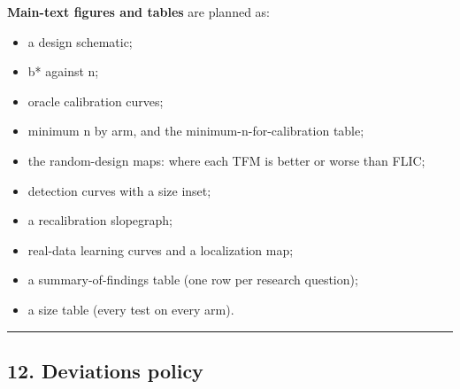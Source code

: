 \documentclass[
  10pt,
]{article}
\providecommand{\tightlist}{%
  \setlength{\itemsep}{0pt}\setlength{\parskip}{0pt}}
\begin{document}
\textbf{Main-text figures and tables} are planned as:

\begin{itemize}
\tightlist
\item
  a design schematic;
\item
  b* against n;
\item
  oracle calibration curves;
\item
  minimum n by arm, and the minimum-n-for-calibration table;
\item
  the random-design maps: where each TFM is better or worse
  than FLIC;
\item
  detection curves with a size inset;
\item
  a recalibration slopegraph;
\item
  real-data learning curves and a localization map;
\item
  a summary-of-findings table (one row per research
  question);
\item
  a size table (every test on every arm).
\end{itemize}

\begin{center}\rule{0.5\linewidth}{0.5pt}\end{center}

\subsection{12. Deviations policy}\label{deviations-policy}
\end{document}
